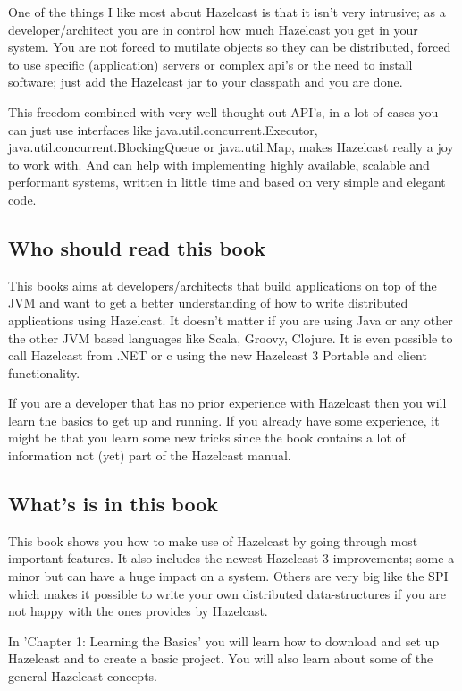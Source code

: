 One of the things I like most about Hazelcast is that it isn't very intrusive; as a developer/architect you are in control how much Hazelcast you get in your system. You are not forced to mutilate objects so they can be distributed, forced to use specific (application) servers or complex api's or the need to install software; just add the Hazelcast jar to your classpath and you are done.

This freedom combined with very well thought out API's, in a lot of cases you can just use interfaces like java.util.concurrent.Executor, java.util.concurrent.BlockingQueue or java.util.Map, makes Hazelcast really a joy to work with. And can help with implementing highly available, scalable and performant systems, written in little time and based on very simple and elegant code.

\subsection*{Who should read this book}
This books aims at developers/architects that build applications on top of the JVM and want to get a better understanding of how to write distributed applications using Hazelcast. It doesn't matter if you are using Java or any other the other JVM based languages like Scala, Groovy, Clojure. It is even possible to call Hazelcast from .NET or c using the new Hazelcast 3 Portable and client functionality.

If you are a developer that has no prior experience with Hazelcast then you will learn the basics to get up and running. If you already have some experience, it might be that you learn some new tricks since the book contains a lot of information not (yet) part of the Hazelcast manual.
 
\subsection*{What's is in this book}
This book shows you how to make use of Hazelcast by going through most important features. It also includes the newest Hazelcast 3 improvements; some a minor but can have a huge impact on a system. Others are very big like the SPI which makes it possible to write your own distributed data-structures if you are not happy with the ones provides by Hazelcast.

In 'Chapter 1: Learning the Basics' you will learn how to download and set up Hazelcast and to create a basic project. You will also learn about some of the general Hazelcast concepts.

